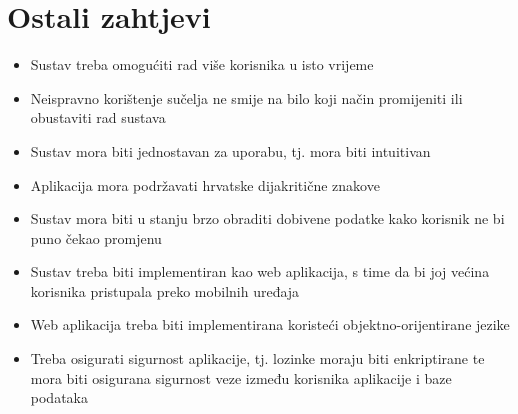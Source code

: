 		\section{Ostali zahtjevi}
			 \begin{itemize}
			 	\item  Sustav treba omogućiti rad više korisnika u isto vrijeme
			 	\item  Neispravno korištenje sučelja ne smije na bilo koji način promijeniti ili obustaviti rad sustava
			 	\item  Sustav mora biti jednostavan za uporabu, tj. mora biti intuitivan
			 	\item Aplikacija mora podržavati hrvatske dijakritične znakove
			 	\item  Sustav mora biti u stanju brzo obraditi dobivene podatke kako korisnik ne bi puno čekao promjenu
			 	\item  Sustav treba biti implementiran kao web aplikacija, s time da bi joj većina korisnika pristupala preko mobilnih uređaja
			 	\item Web aplikacija treba biti implementirana koristeći objektno-orijentirane jezike
			 	\item  Treba osigurati sigurnost aplikacije, tj. lozinke moraju biti enkriptirane te mora biti osigurana sigurnost veze između korisnika aplikacije i baze podataka 
			 \end{itemize}